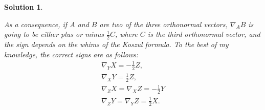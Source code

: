 \documentclass{article}
\theoremstyle{plain}
\theoremstyle{nonumberplain}
\newtheorem{sol}{Solution}
\begin{document}
\begin{sol}
\begin{enumerate}
As a consequence, if $A$ and $B$ are two of the three orthonormal vectors, $\nabla_A B$ is going to be either plus or minus $\frac12 C$, where $C$ is the third orthonormal vector, and the sign depends on the whims of the Koszul formula. To the best of my knowledge, the correct signs are as follows:
\begin{equation}
\begin{gathered}
\nabla_Y X = - \frac12 Z,\\
\nabla_X Y = \frac12 Z,\\
\nabla_Z X = \nabla_X Z = - \frac12 Y\\
\nabla_Z Y = \nabla_Y Z = \frac12 X.
\end{gathered}
\end{equation}

\end{enumerate}
\end{sol}
\end{document}
